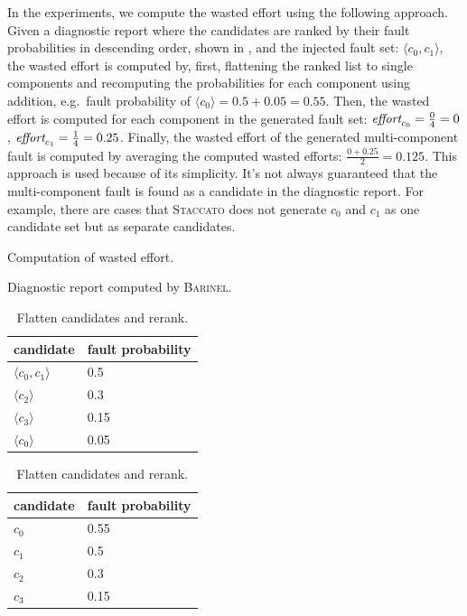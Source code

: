 \documentclass[twoside,a4paper,11pt]{memoir}
\begin{document}
In the experiments, we compute the wasted effort using the following approach.
Given a diagnostic report where the candidates are ranked by their fault probabilities in descending order, shown in , and the injected fault set: \(\langle c_0, c_1 \rangle \), the wasted effort is computed by, first, flattening the ranked list to single components and recomputing the probabilities for each component using addition, e.g.\ fault probability of \(\langle c_0 \rangle = 0.5 + 0.05 = 0.55\).
Then, the wasted effort is computed for each component in the generated fault set: \(\emph{effort}_{c_0} = \frac{0}{4} = 0\), \(\emph{effort}_{c_1} = \frac{1}{4} = 0.25\).
Finally, the wasted effort of the generated multi-component fault is computed by averaging the computed wasted efforts: \(\frac{0 + 0.25}{2} = 0.125\).
This approach is used because of its simplicity.
It's not always guaranteed that the multi-component fault is found as a candidate in the diagnostic report.
For example, there are cases that \textsc{Staccato} does not generate \(c_0\) and \(c_1\) as one candidate set but as separate candidates.
\begin{table}[]
    \centering
    \scriptsize
    \caption{Computation of wasted effort.}%
    \label{tab:diagnostic_report}
    \begin{subtable}{.5\linewidth}
      \centering
        \caption{Diagnostic report computed by \textsc{Barinel}.}
        \begin{tabular}{l|l}
            candidate & fault probability \\ \hline
            \(\langle c_0, c_1 \rangle \) & 0.5 \\
            \(\langle c_2 \rangle \) & 0.3 \\
            \(\langle c_3 \rangle \) & 0.15 \\
            \(\langle c_0 \rangle \) & 0.05 \\
        \end{tabular}
    \end{subtable}%
    \begin{subtable}{.5\linewidth}
      \centering
        \caption{Flatten candidates and rerank.}
        \begin{tabular}{l|l}
            candidate & fault probability \\ \hline
            \( c_0 \) & 0.55 \\
            \(c_1 \) & 0.5 \\
            \(c_2 \) & 0.3 \\
            \(c_3 \) & 0.15 \\
        \end{tabular}
    \end{subtable}
\end{table}
\end{document}
